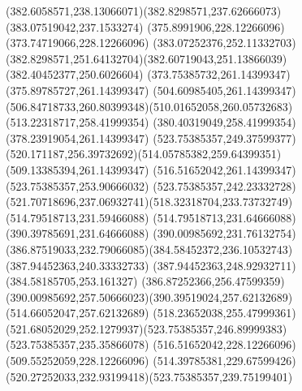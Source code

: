 {{\curveto(382.6058571,238.13066071)(382.8298571,237.62666073)(383.07519042,237.1533274)
\lineto(375.8991906,228.12266096)
\lineto(373.74719066,228.12266096)
\closepath
\moveto(383.07252376,252.11332703)
\curveto(382.8298571,251.64132704)(382.60719043,251.13866039)(382.40452377,250.6026604)
\lineto(373.75385732,261.14399347)
\lineto(375.89785727,261.14399347)
\closepath
\moveto(504.60985405,261.14399347)
\curveto(506.84718733,260.80399348)(510.01652058,260.05732683)(513.22318717,258.41999354)
\lineto(380.40319049,258.41999354)
\lineto(378.23919054,261.14399347)
\closepath
\moveto(523.75385357,249.37599377)
\curveto(520.171187,256.39732692)(514.05785382,259.64399351)(509.13385394,261.14399347)
\lineto(516.51652042,261.14399347)
\lineto(523.75385357,253.90666032)
\closepath
\moveto(523.75385357,242.23332728)
\curveto(521.70718696,237.06932741)(518.32318704,233.73732749)(514.79518713,231.59466088)
\lineto(514.79518713,231.64666088)
\lineto(390.39785691,231.64666088)
\curveto(390.00985692,231.76132754)(386.87519033,232.79066085)(384.58452372,236.10532743)
\lineto(387.94452363,240.33332733)
\lineto(387.94452363,248.92932711)
\lineto(384.58185705,253.161327)
\curveto(386.87252366,256.47599359)(390.00985692,257.50666023)(390.39519024,257.62132689)
\lineto(514.66052047,257.62132689)
\curveto(518.23652038,255.47999361)(521.68052029,252.1279937)(523.75385357,246.89999383)
\closepath
\moveto(523.75385357,235.35866078)
\lineto(516.51652042,228.12266096)
\lineto(509.55252059,228.12266096)
\curveto(514.39785381,229.67599426)(520.27252033,232.93199418)(523.75385357,239.75199401)
\closepath
}
}
{
}
